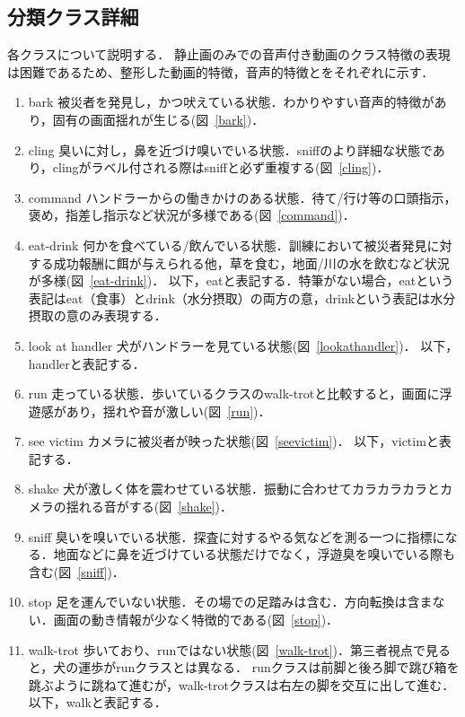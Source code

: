 \subsection{分類クラス詳細}
各クラスについて説明する．
静止画のみでの音声付き動画のクラス特徴の表現は困難であるため、整形した動画的特徴，音声的特徴とをそれぞれに示す．
\begin{enumerate}
\item{bark}
被災者を発見し，かつ吠えている状態．わかりやすい音声的特徴があり，固有の画面揺れが生じる(図~\ref{bark})．
\item{cling}
臭いに対し，鼻を近づけ嗅いでいる状態．sniffのより詳細な状態であり，clingがラベル付される際はsniffと必ず重複する(図~\ref{cling})．
\item{command}
ハンドラーからの働きかけのある状態．待て/行け等の口頭指示，褒め，指差し指示など状況が多様である(図~\ref{command})．
\item{eat-drink}
何かを食べている/飲んでいる状態．訓練において被災者発見に対する成功報酬に餌が与えられる他，草を食む，地面/川の水を飲むなど状況が多様(図~\ref{eat-drink})．
以下，eatと表記する．特筆がない場合，eatという表記はeat（食事）とdrink（水分摂取）の両方の意，drinkという表記は水分摂取の意のみ表現する．
\item{look at handler}
犬がハンドラーを見ている状態(図~\ref{lookathandler})．
以下，handlerと表記する．
\item{run}
走っている状態．歩いているクラスのwalk-trotと比較すると，画面に浮遊感があり，揺れや音が激しい(図~\ref{run})．
\item{see victim}
カメラに被災者が映った状態(図~\ref{seevictim})．
以下，victimと表記する．
\item{shake}
犬が激しく体を震わせている状態．振動に合わせてカラカラカラとカメラの揺れる音がする(図~\ref{shake})．
\item{sniff}
臭いを嗅いでいる状態．探査に対するやる気などを測る一つに指標になる．地面などに鼻を近づけている状態だけでなく，浮遊臭を嗅いでいる際も含む(図~\ref{sniff})．
\item{stop}
足を運んでいない状態．その場での足踏みは含む．方向転換は含まない．画面の動き情報が少なく特徴的である(図~\ref{stop})．
\item{walk-trot}
歩いており、runではない状態(図~\ref{walk-trot})．第三者視点で見ると，犬の運歩がrunクラスとは異なる．
runクラスは前脚と後ろ脚で跳び箱を跳ぶように跳ねて進むが，walk-trotクラスは右左の脚を交互に出して進む．
以下，walkと表記する．
\end{enumerate}

